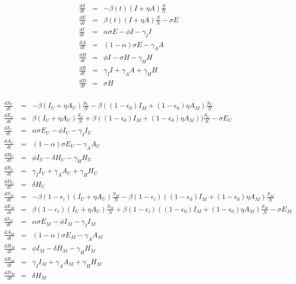 \documentclass{article}
\begin{document}
 \begin{minipage}{0.45\textwidth}
 \begin{eqnarray}
   \frac{dS}{dt} &=& -\beta{(t)}(I+\eta A)\frac{S}{N}\nonumber\\
   \frac{dE}{dt} &=& \beta(t)(I+\eta A)\frac{S}{N}-\sigma{E}\nonumber\\
   \frac{dI}{dt} &=& \alpha\sigma{E}-\phi{I}-\gamma_{I}I\nonumber\\
   \frac{dA}{dt} &=& (1-\alpha)\sigma E-\gamma_{A}A\nonumber\\
   \frac{dH}{dt} &=& \phi I - \sigma H - \gamma_{H}H\nonumber\\
   \frac{dR}{dt} &=& \gamma_{I}{I} + \gamma_{A}{A}+\gamma_{H}{H}\nonumber\\
   \frac{dD}{dt} &=& \sigma H\nonumber\\
 \end{eqnarray}
 \end{minipage}
 \begin{minipage}{0.35\textwidth}
 \tiny
 \begin{eqnarray}
   \frac{dS_{U}}{dt} &=& -\beta(I_{U}+\eta A_{U})\frac{S_{U}}{N}-\beta((1-\epsilon_{0})I_{M}+(1-\epsilon_{0})\eta A_{M})\frac{S_{U}}{N}\nonumber\\
   \frac{dE_{U}}{dt} &=& \beta(I_{U}+\eta{A}_{U})\frac{S_{U}}{N}+\beta((1-\epsilon_{0})I_{M}+(1-\epsilon_{0})\eta A_{M}))\frac{S_{U}}{N}-\sigma E_{U}\nonumber\\
   \frac{dI_{U}}{dt} &=& \alpha\sigma E_{U}-\phi I_{U} - \gamma_{I}I_{U}\nonumber\\
   \frac{dA_{U}}{dt} &=& (1-\alpha)\sigma E_{U}-\gamma_{A}A_{U}\nonumber\\
   \frac{dH_{U}}{dt} &=& \phi I_{U}-\delta H_{U}-\gamma_{H}H_{U}\nonumber\\
   \frac{dR_{U}}{dt} &=& \gamma_{I}I_{U}+\gamma_{A}A_{U}+\gamma_{H}H_{U}\nonumber\\
   \frac{dD_{U}}{dt} &=& \delta H_{U}\nonumber\\
   \frac{dS_{M}}{dt} &=& -\beta (1-\epsilon_{i})(I_{U}+\eta A_{U})\frac{S_{M}}{N}-\beta(1-\epsilon_{i})((1-\epsilon_{0})I_{M}+(1-\epsilon_{0})\eta A_{M})\frac{S_{M}}{N}\nonumber\\
   \frac{dE_{M}}{dt} &=& \beta(1-\epsilon_{i})(I_{U}+\eta A_{U})\frac{S_{M}}{N}+\beta(1-\epsilon_{i})((1-\epsilon_{0})I_{M}+(1-\epsilon_{0})\eta A_{M})\frac{S_{M}}{N}-\sigma E_{M}\nonumber\\
   \frac{dI_{M}}{dt} &=& \alpha\sigma E_{M}-\phi I_{M}-\gamma_{I} I_{M}\nonumber\\
   \frac{dA_{M}}{dt} &=& (1-\alpha)\sigma E_{M}-\gamma_{A}A_{M}\nonumber\\
   \frac{dH_{M}}{dt} &=& \phi I_{M}-\delta H_{M}-\gamma_{H} H_{M}\nonumber\\
   \frac{dR_{M}}{dt} &=& \gamma_{I}I_{M}+\gamma_{A}A_{M}+\gamma_{H}H_{M}\nonumber\\
   \frac{dD_{M}}{dt} &=& \delta H_{M}\nonumber\\
   \end{eqnarray}
 \end{minipage}
\end{document}
